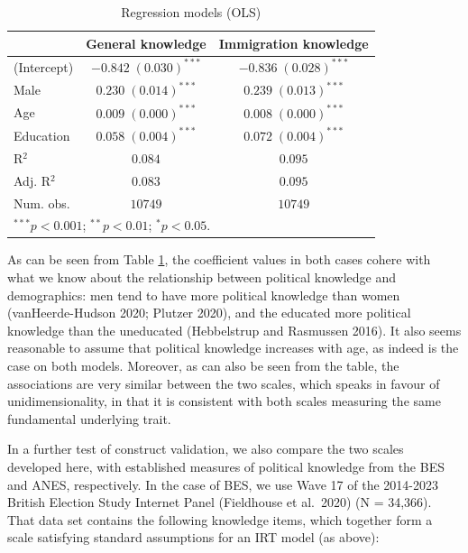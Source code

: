 \documentclass[11pt,halfline,a4paper,]{ouparticle}
\begin{document}
\begin{table}[h!]
\caption{Regression models (OLS)}
\begin{center}
\begin{tabular}{l c c}
\hline
 & General knowledge & Immigration knowledge \\
\hline
(Intercept) & $-0.842 \; (0.030)^{***}$ & $-0.836 \; (0.028)^{***}$ \\
Male        & $0.230 \; (0.014)^{***}$  & $0.239 \; (0.013)^{***}$  \\
Age         & $0.009 \; (0.000)^{***}$  & $0.008 \; (0.000)^{***}$  \\
Education   & $0.058 \; (0.004)^{***}$  & $0.072 \; (0.004)^{***}$  \\
\hline
R$^2$       & $0.084$                   & $0.095$                   \\
Adj. R$^2$  & $0.083$                   & $0.095$                   \\
Num. obs.   & $10749$                   & $10749$                   \\
\hline
\multicolumn{3}{l}{\scriptsize{$^{***}p<0.001$; $^{**}p<0.01$; $^{*}p<0.05$.}}
\end{tabular}
\label{tab:4}
\end{center}
\end{table}

As can be seen from Table \ref{tab:4}, the coefficient values in both
cases cohere with what we know about the relationship between political
knowledge and demographics: men tend to have more political knowledge
than women (vanHeerde-Hudson 2020; Plutzer 2020), and the educated more
political knowledge than the uneducated (Hebbelstrup and Rasmussen
2016). It also seems reasonable to assume that political knowledge
increases with age, as indeed is the case on both models. Moreover, as
can also be seen from the table, the associations are very similar
between the two scales, which speaks in favour of unidimensionality, in
that it is consistent with both scales measuring the same fundamental
underlying trait.

In a further test of construct validation, we also compare the two
scales developed here, with established measures of political knowledge
from the BES and ANES, respectively. In the case of BES, we use Wave 17
of the 2014-2023 British Election Study Internet Panel (Fieldhouse et
al.~2020) (N = 34,366). That data set contains the following knowledge
items, which together form a scale satisfying standard assumptions for
an IRT model (as above):
\end{document}
